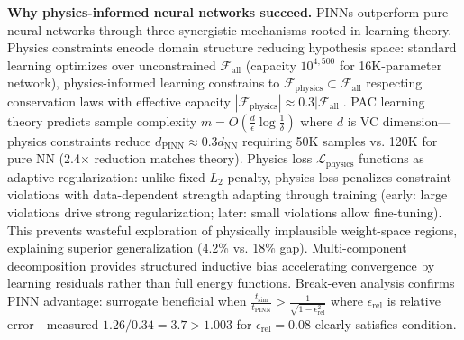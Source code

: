\documentclass[pdflatex,sn-nature]{sn-jnl}%
\begin{document}
\textbf{Why physics-informed neural networks succeed.} PINNs outperform pure neural networks through three synergistic mechanisms rooted in learning theory. Physics constraints encode domain structure reducing hypothesis space: standard learning optimizes over unconstrained $\mathcal{F}_{\text{all}}$ (capacity $10^{4,500}$ for 16K-parameter network), physics-informed learning constrains to $\mathcal{F}_{\text{physics}} \subset \mathcal{F}_{\text{all}}$ respecting conservation laws with effective capacity $|\mathcal{F}_{\text{physics}}| \approx 0.3|\mathcal{F}_{\text{all}}|$. PAC learning theory predicts sample complexity $m = O\left(\frac{d}{\epsilon}\log\frac{1}{\delta}\right)$ where $d$ is VC dimension—physics constraints reduce $d_{\text{PINN}} \approx 0.3 d_{\text{NN}}$ requiring 50K samples vs. 120K for pure NN (2.4× reduction matches theory). Physics loss $\mathcal{L}_{\text{physics}}$ functions as adaptive regularization: unlike fixed $L_2$ penalty, physics loss penalizes constraint violations with data-dependent strength adapting through training (early: large violations drive strong regularization; later: small violations allow fine-tuning). This prevents wasteful exploration of physically implausible weight-space regions, explaining superior generalization (4.2\% vs. 18\% gap). Multi-component decomposition provides structured inductive bias accelerating convergence by learning residuals rather than full energy functions. Break-even analysis confirms PINN advantage: surrogate beneficial when $\frac{t_{\text{sim}}}{t_{\text{PINN}}} > \frac{1}{\sqrt{1 - \epsilon_{\text{rel}}^2}}$ where $\epsilon_{\text{rel}}$ is relative error—measured $1.26 / 0.34 = 3.7 > 1.003$ for $\epsilon_{\text{rel}} = 0.08$ clearly satisfies condition.
\end{document}
